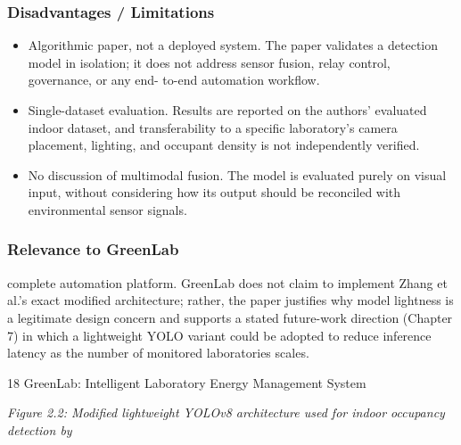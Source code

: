 \subsubsection*{Disadvantages / Limitations}




\begin{itemize}
  \item Algorithmic paper, not a deployed system. The paper validates a detection model
in isolation; it does not address sensor fusion, relay control, governance, or any end-
to-end automation workﬂow.
\end{itemize}



\begin{itemize}
  \item Single-dataset evaluation. Results are reported on the authors' evaluated indoor
dataset, and transferability to a speciﬁc laboratory's camera placement, lighting, and
occupant density is not independently veriﬁed.
\end{itemize}



\begin{itemize}
  \item No discussion of multimodal fusion. The model is evaluated purely on visual input,
without considering how its output should be reconciled with environmental sensor
signals.
\end{itemize}





\subsubsection*{Relevance to GreenLab}

complete automation platform. GreenLab does not claim to implement Zhang et al.'s exact
modiﬁed architecture; rather, the paper justiﬁes why model lightness is a legitimate design concern and supports a stated future-work direction (Chapter 7) in which a lightweight
YOLO variant could be adopted to reduce inference latency as the number of monitored
laboratories scales.

18
GreenLab: Intelligent Laboratory Energy Management System





\textit{Figure 2.2: Modiﬁed lightweight YOLOv8 architecture used for indoor occupancy detection by}

